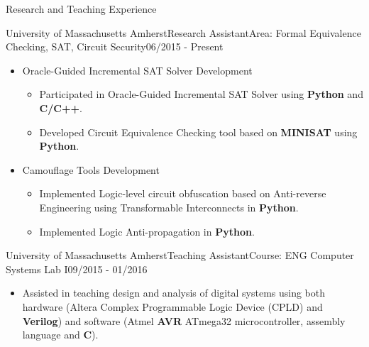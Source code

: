\documentclass{resume} %
\begin{document}
\begin{rSection}{Research and Teaching Experience}\itemsep 2pt

\begin{rSubsection}{University of Massachusetts Amherst}{Research Assistant}{Area: Formal Equivalence Checking, SAT, Circuit Security}{06/2015 - Present}\itemsep -1pt
\item
	\begin{itemize}\itemsep -3pt
    
    	\item Oracle-Guided Incremental SAT Solver Development   
\begin{itemize}
		\item Participated in Oracle-Guided Incremental SAT Solver using \textbf{Python} and \textbf{C/C++}.\par
		\item Developed Circuit Equivalence Checking tool based on \textbf{MINISAT} using \textbf{Python}.\par 
\end{itemize}

	\item Camouflage Tools Development
\begin{itemize}
		\item Implemented Logic-level circuit obfuscation based on Anti-reverse Engineering using Transformable Interconnects in \textbf{Python}.\par
		\item Implemented Logic Anti-propagation in \textbf{Python}.\par		
\end{itemize} 

	\end{itemize}

\end{rSubsection}



\begin{rSubsection}{University of Massachusetts Amherst}{Teaching Assistant}{Course: ENG Computer Systems Lab I}{09/2015 - 01/2016}\itemsep -4pt
\item 
\begin{itemize}
\item Assisted in teaching design and analysis of digital systems using both hardware (Altera Complex Programmable Logic Device (CPLD) and \textbf{Verilog}) and software (Atmel \textbf{AVR}  ATmega32 microcontroller, assembly language and \textbf{C}).
\end{itemize}

\end{rSubsection}

\end{rSection}
\end{document}
